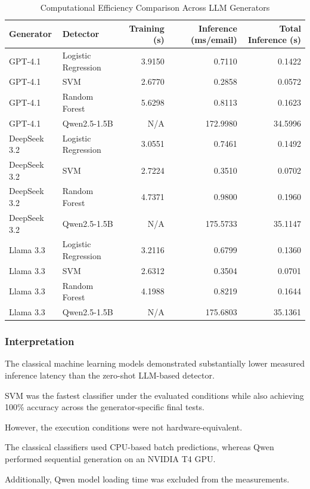 \documentclass[sigconf,nonacm]{acmart}
\begin{document}
\begin{table}[t]
\centering
\caption{Computational Efficiency
Comparison Across LLM Generators}
\label{tab:efficiency}
\footnotesize
\begin{tabular}{llrrr}
\toprule
Generator & Detector &
Training (s) &
Inference (ms/email) &
Total Inference (s) \\
\midrule
GPT-4.1 & Logistic Regression &
3.9150 & 0.7110 & 0.1422 \\
GPT-4.1 & SVM &
2.6770 & 0.2858 & 0.0572 \\
GPT-4.1 & Random Forest &
5.6298 & 0.8113 & 0.1623 \\
GPT-4.1 & Qwen2.5-1.5B &
N/A & 172.9980 & 34.5996 \\
\midrule
DeepSeek 3.2 & Logistic Regression &
3.0551 & 0.7461 & 0.1492 \\
DeepSeek 3.2 & SVM &
2.7224 & 0.3510 & 0.0702 \\
DeepSeek 3.2 & Random Forest &
4.7371 & 0.9800 & 0.1960 \\
DeepSeek 3.2 & Qwen2.5-1.5B &
N/A & 175.5733 & 35.1147 \\
\midrule
Llama 3.3 & Logistic Regression &
3.2116 & 0.6799 & 0.1360 \\
Llama 3.3 & SVM &
2.6312 & 0.3504 & 0.0701 \\
Llama 3.3 & Random Forest &
4.1988 & 0.8219 & 0.1644 \\
Llama 3.3 & Qwen2.5-1.5B &
N/A & 175.6803 & 35.1361 \\
\bottomrule
\end{tabular}
\end{table}

\subsubsection{Interpretation}

The classical machine learning models
demonstrated substantially lower measured
inference latency than the zero-shot
LLM-based detector.

SVM was the fastest classifier under
the evaluated conditions while also
achieving 100\% accuracy across
the generator-specific final tests.

However, the execution conditions
were not hardware-equivalent.

The classical classifiers used
CPU-based batch predictions,
whereas Qwen performed sequential
generation on an NVIDIA T4 GPU.

Additionally, Qwen model loading time
was excluded from the measurements.
\end{document}
